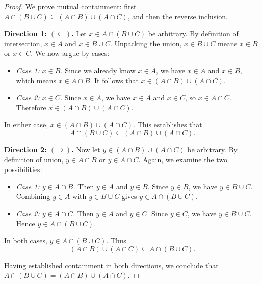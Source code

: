 \begin{proof}
We prove mutual containment: first $A \cap (B \cup C) \subseteq (A \cap B) \cup (A \cap C)$, and then the reverse inclusion.

\textbf{Direction 1: $(\subseteq)$.} Let $x \in A \cap (B \cup C)$ be arbitrary. 
By definition of intersection, $x \in A$ and $x \in B \cup C$. 
Unpacking the union, $x \in B \cup C$ means $x \in B$ or $x \in C$. We now argue by cases:
\begin{itemize}
\item \emph{Case 1: $x \in B$.} Since we already know $x \in A$, we have $x \in A$ and $x \in B$, which means $x \in A \cap B$. It follows that $x \in (A \cap B) \cup (A \cap C)$.
\item \emph{Case 2: $x \in C$.} Since $x \in A$, we have $x \in A$ and $x \in C$, so $x \in A \cap C$. Therefore $x \in (A \cap B) \cup (A \cap C)$.
\end{itemize}
In either case, $x \in (A \cap B) \cup (A \cap C)$. This establishes that
\[
A \cap (B \cup C) \subseteq (A \cap B) \cup (A \cap C).
\]

\textbf{Direction 2: $(\supseteq)$.} Now let $y \in (A \cap B) \cup (A \cap C)$ be arbitrary.
By definition of union, $y \in A \cap B$ or $y \in A \cap C$. Again, we examine the two possibilities:
\begin{itemize}
\item \emph{Case 1: $y \in A \cap B$.} Then $y \in A$ and $y \in B$. Since $y \in B$, we have $y \in B \cup C$. Combining $y \in A$ with $y \in B \cup C$ gives $y \in A \cap (B \cup C)$.
\item \emph{Case 2: $y \in A \cap C$.} Then $y \in A$ and $y \in C$. Since $y \in C$, we have $y \in B \cup C$. Hence $y \in A \cap (B \cup C)$.
\end{itemize}
In both cases, $y \in A \cap (B \cup C)$. Thus
\[
(A \cap B) \cup (A \cap C) \subseteq A \cap (B \cup C).
\]

Having established containment in both directions, we conclude that $A \cap (B \cup C) = (A \cap B) \cup (A \cap C)$.
\end{proof}


